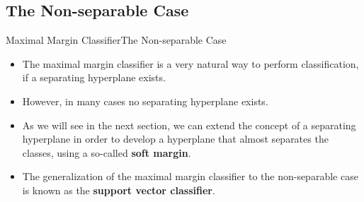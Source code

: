 \subsection{The Non-separable Case}
\begin{frame}{Maximal Margin Classifier}{The Non-separable Case}    

\begin{itemize}
    \item The maximal margin classifier is a very natural way to perform classification, if a separating hyperplane exists. \pause 
    
    \item However, in many cases no separating hyperplane exists. \pause

    \item As we will see in the next section, we can extend the concept of a separating hyperplane in order to develop a hyperplane that almost separates the classes, using a so-called \textbf{soft margin}. \pause 

    \item The generalization of the maximal margin classifier to the
non-separable case is known as the \textbf{support vector classifier}.
\end{itemize}

\end{frame}






